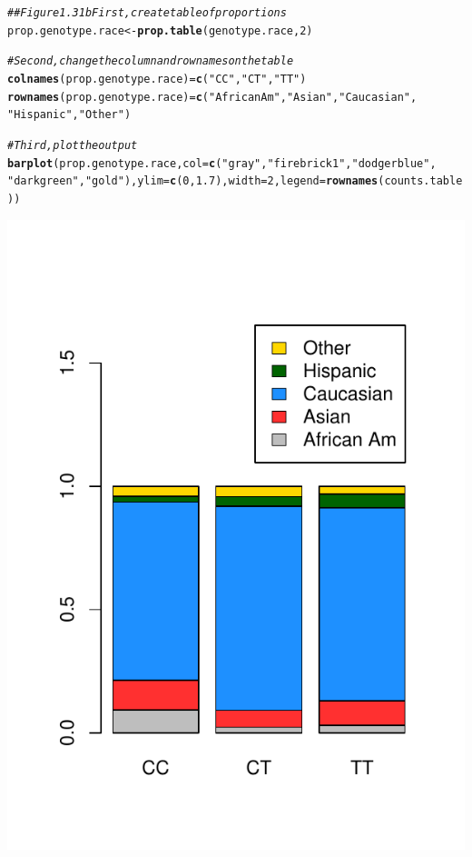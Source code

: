 \documentclass{report}\usepackage[]{graphicx}\usepackage[]{color}
\makeatletter
\def\maxwidth{ %
  \ifdim\Gin@nat@width>\linewidth
    \linewidth
  \else
    \Gin@nat@width
  \fi
}
\newcommand{\hlnum}[1]{\textcolor[rgb]{0.686,0.059,0.569}{#1}}%
\newcommand{\hlstr}[1]{\textcolor[rgb]{0.192,0.494,0.8}{#1}}%
\newcommand{\hlcom}[1]{\textcolor[rgb]{0.678,0.584,0.686}{\textit{#1}}}%
\newcommand{\hlstd}[1]{\textcolor[rgb]{0.345,0.345,0.345}{#1}}%
\newcommand{\hlkwb}[1]{\textcolor[rgb]{0.69,0.353,0.396}{#1}}%
\newcommand{\hlkwc}[1]{\textcolor[rgb]{0.333,0.667,0.333}{#1}}%
\newcommand{\hlkwd}[1]{\textcolor[rgb]{0.737,0.353,0.396}{\textbf{#1}}}%
\newenvironment{kframe}{%
 \def\at@end@of@kframe{}%
 \ifinner\ifhmode%
  \def\at@end@of@kframe{\end{minipage}}%
  \begin{minipage}{\columnwidth}%
 \fi\fi%
 \def\FrameCommand##1{\hskip\@totalleftmargin \hskip-\fboxsep
 \colorbox{shadecolor}{##1}\hskip-\fboxsep
     \hskip-\linewidth \hskip-\@totalleftmargin \hskip\columnwidth}%
 \MakeFramed {\advance\hsize-\width
   \@totalleftmargin\z@ \linewidth\hsize
   \@setminipage}}%
 {\par\unskip\endMakeFramed%
 \at@end@of@kframe}
\newenvironment{knitrout}{}{} %
\makeatother
\begin{document}
\begin{knitrout}
\color{fgcolor}\begin{kframe}
\begin{alltt}
\hlcom{## Figure 1.31b First, create table of proportions}
\hlstd{prop.genotype.race} \hlkwb{<-} \hlkwd{prop.table}\hlstd{(genotype.race,} \hlnum{2}\hlstd{)}

\hlcom{# Second, change the column and row names on the table}
\hlkwd{colnames}\hlstd{(prop.genotype.race)} \hlkwb{=} \hlkwd{c}\hlstd{(}\hlstr{"CC"}\hlstd{,} \hlstr{"CT"}\hlstd{,} \hlstr{"TT"}\hlstd{)}
\hlkwd{rownames}\hlstd{(prop.genotype.race)} \hlkwb{=} \hlkwd{c}\hlstd{(}\hlstr{"African Am"}\hlstd{,} \hlstr{"Asian"}\hlstd{,} \hlstr{"Caucasian"}\hlstd{,}
    \hlstr{"Hispanic"}\hlstd{,} \hlstr{"Other"}\hlstd{)}

\hlcom{# Third, plot the output}
\hlkwd{barplot}\hlstd{(prop.genotype.race,} \hlkwc{col} \hlstd{=} \hlkwd{c}\hlstd{(}\hlstr{"gray"}\hlstd{,} \hlstr{"firebrick1"}\hlstd{,} \hlstr{"dodgerblue"}\hlstd{,}
    \hlstr{"darkgreen"}\hlstd{,} \hlstr{"gold"}\hlstd{),} \hlkwc{ylim} \hlstd{=} \hlkwd{c}\hlstd{(}\hlnum{0}\hlstd{,} \hlnum{1.7}\hlstd{),} \hlkwc{width} \hlstd{=} \hlnum{2}\hlstd{,} \hlkwc{legend} \hlstd{=} \hlkwd{rownames}\hlstd{(counts.table))}
\end{alltt}
\end{kframe}

{\centering \includegraphics[width=\maxwidth]{figure/unnamed-chunk-37-1} 

}
\end{knitrout}
\end{document}
